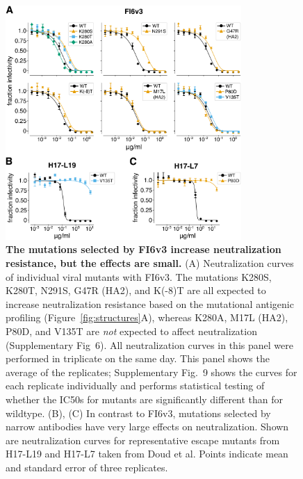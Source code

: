 \documentclass[11pt]{article}
\begin{document}
\begin{figure}
\centerline{\includegraphics[width=0.8\textwidth]{Fig6.pdf}}
\caption{
\label{fig:FI6v3neutcurves}
{\bf The mutations selected by FI6v3 increase neutralization resistance, but the effects are small.}
(A) Neutralization curves of individual viral mutants with FI6v3.
The mutations K280S, K280T, N291S, G47R (HA2), and K(-8)T are all expected to increase neutralization resistance based on the mutational antigenic profiling (Figure~\ref{fig:structures}A), whereas K280A, M17L (HA2), P80D, and V135T are \emph{not} expected to affect neutralization (Supplementary Fig~6).
All neutralization curves in this panel were performed in triplicate on the same day.
This panel shows the average of the replicates; Supplementary Fig.~9 shows the curves for each replicate individually and performs statistical testing of whether the IC50s for mutants are significantly different than for wildtype.
(B), (C) In contrast to FI6v3, mutations selected by narrow antibodies have very large effects on neutralization.
Shown are neutralization curves for representative escape mutants from H17-L19 and H17-L7 taken from Doud et al\cite{doud2017complete}.
Points indicate mean and standard error of three replicates.
}
\end{figure}

\clearpage
\end{document}
